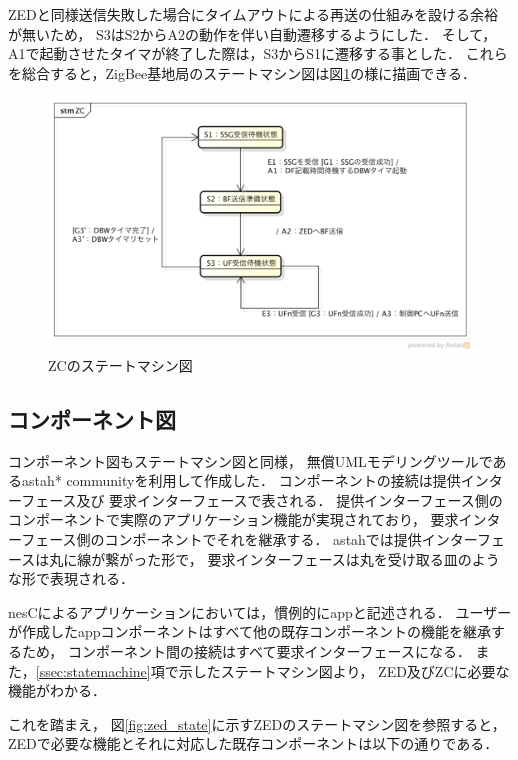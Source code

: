 \documentclass[12pt]{jreport}
\begin{document}
ZEDと同様送信失敗した場合にタイムアウトによる再送の仕組みを設ける余裕が無いため，
S3はS2からA2の動作を伴い自動遷移するようにした．
そして，A1で起動させたタイマが終了した際は，S3からS1に遷移する事とした．
これらを総合すると，ZigBee基地局のステートマシン図は図\ref{fig:zc_state}の様に描画できる．

\begin{figure}[bt]
 \centering
 \includegraphics[width=\columnwidth]{figure/zc_state.pdf}
 \caption{ZCのステートマシン図}
 \label{fig:zc_state}
\end{figure}

\subsection{コンポーネント図}
コンポーネント図もステートマシン図と同様，
無償UMLモデリングツールであるastah* communityを利用して作成した．
コンポーネントの接続は提供インターフェース及び
要求インターフェースで表される．
提供インターフェース側のコンポーネントで実際のアプリケーション機能が実現されており，
要求インターフェース側のコンポーネントでそれを継承する．
astahでは提供インターフェースは丸に線が繋がった形で，
要求インターフェースは丸を受け取る皿のような形で表現される．

nesCによるアプリケーションにおいては，慣例的にappと記述される．
ユーザーが作成したappコンポーネントはすべて他の既存コンポーネントの機能を継承するため，
コンポーネント間の接続はすべて要求インターフェースになる．
また，\ref{ssec:statemachine}項で示したステートマシン図より，
ZED及びZCに必要な機能がわかる．

これを踏まえ，
図\ref{fig:zed_state}に示すZEDのステートマシン図を参照すると，
ZEDで必要な機能とそれに対応した既存コンポーネントは以下の通りである．
\end{document}
